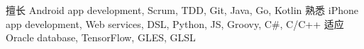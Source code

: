 
\begin{cvskills}
	\cvskill
		{擅长}
		{Android app development,\enskip 
		Scrum,\enskip 
		TDD,\enskip 
		Git,\enskip 
		Java,\enskip 
		Go,\enskip 
		Kotlin}
	\cvskill
		{熟悉}
		{iPhone app development,\enskip 
		Web services,\enskip 
		DSL,\enskip 
		Python,\enskip 
		JS,\enskip 
		Groovy,\enskip 
		C\#,\enskip 
		C/C++}
	\cvskill
		{适应}
		{Oracle database,\enskip 
		TensorFlow,\enskip 
		GLES,\enskip 
		GLSL}
\end{cvskills}

